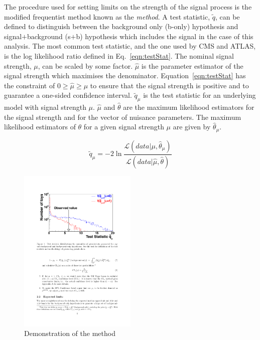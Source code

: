 The procedure used for setting limits on the strength of the signal process is the modified frequentist method known as the \emph{\CLS method}.
A test statistic, $\tilde{q}$, can be defined to distinguish between the background only (b-only) hypothesis and signal$+$background (s$+$b) hypothesis which includes the \tttt signal in the case of this analysis. The most common test statistic, and the one used by CMS and ATLAS, is the log likelihood ratio defined in Eq.~\ref{eqn:testStat}. The nominal signal strength, $\mu$, can be scaled by some factor. $\hat{\mu}$ is the parameter estimator of the signal strength which maximises the denominator. Equation~\ref{eqn:testStat} has the constraint of $0\geq \hat{\mu}\geq \mu$ to ensure that the signal strength is positive and to guarantee a one-sided confidence interval. $\tilde{q}_{\mu}$ is the test statistic for an underlying model with signal strength $\mu$. $\hat{\mu}$ and $\hat{\theta}$ are the maximum likelihood estimators for the signal strength and for the vector of nuisance parameters. The maximum likelihood estimators of $\theta$ for a given signal strength $\mu$ are given by $\hat{\theta}_{\mu}$.


\begin{equation}
\tilde{q}_{\mu} = -2\ln\frac{\mathcal{L}\left(data|\mu,\hat{\theta}_{\mu}\right)}{\mathcal{L}\left(data|\hat{\mu},\hat{\theta}\right)}
\label{eqn:testStat}
\end{equation}

\begin{figure}[ht!]
\centering
    \includegraphics[width=0.5\textwidth]{images/Analysis/CLSdemo.pdf}
    \caption{Demonstration of the \CLS method~\cite{CMS-NOTE-2011-005}}
    \label{fig:CLSdemo}
\end{figure}

